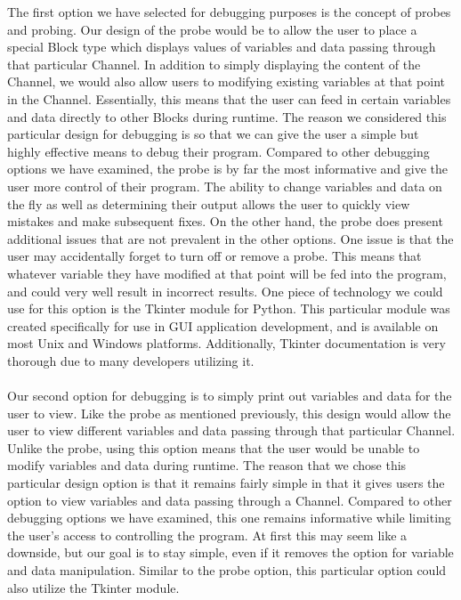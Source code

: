 \documentclass[journal,10pt,onecolumn,compsoc]{IEEEtran} \usepackage[margin=1.0in]{geometry} \usepackage{pdfpages} \usepackage{graphicx}
\begin{document}
\noindent The first option we have selected for debugging purposes is the concept of probes and probing. 
Our design of the probe would be to allow the user to place a special Block type which displays values of variables and data passing through that particular Channel. 
In addition to simply displaying the content of the Channel, we would also allow users to modifying existing variables at that point in the Channel. 
Essentially, this means that the user can feed in certain variables and data directly to other Blocks during runtime. 
The reason we considered this particular design for debugging is so that we can give the user a simple but highly effective means to debug their program. 
Compared to other debugging options we have examined, the probe is by far the most informative and give the user more control of their program. 
The ability to change variables and data on the fly as well as determining their output allows the user to quickly view mistakes and make subsequent fixes. 
On the other hand, the probe does present additional issues that are not prevalent in the other options. 
One issue is that the user may accidentally forget to turn off or remove a probe. 
This means that whatever variable they have modified at that point will be fed into the program, and could very well result in incorrect results. 
One piece of technology we could use for this option is the Tkinter module for Python. 
This particular module was created specifically for use in GUI application development, and is available on most Unix and Windows platforms. 
Additionally, Tkinter documentation is very thorough due to many developers utilizing it. \cite{meyers}
\\
\\
\noindent Our second option for debugging is to simply print out variables and data for the user to view. 
Like the probe as mentioned previously, this design would allow the user to view different variables and data passing through that particular Channel. 
Unlike the probe, using this option means that the user would be unable to modify variables and data during runtime. 
The reason that we chose this particular design option is that it remains fairly simple in that it gives users the option to view variables and data passing through a Channel. 
Compared to other debugging options we have examined, this one remains informative while limiting the user's access to controlling the program. 
At first this may seem like a downside, but our goal is to stay simple, even if it removes the option for variable and data manipulation. 
Similar to the probe option, this particular option could also utilize the Tkinter module. 
\end{document}
